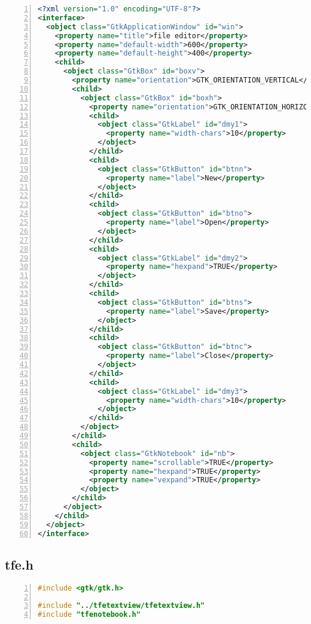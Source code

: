 \begin{lstlisting}[language=XML, numbers=left]
<?xml version="1.0" encoding="UTF-8"?>
<interface>
  <object class="GtkApplicationWindow" id="win">
    <property name="title">file editor</property>
    <property name="default-width">600</property>
    <property name="default-height">400</property>
    <child>
      <object class="GtkBox" id="boxv">
        <property name="orientation">GTK_ORIENTATION_VERTICAL</property>
        <child>
          <object class="GtkBox" id="boxh">
            <property name="orientation">GTK_ORIENTATION_HORIZONTAL</property>
            <child>
              <object class="GtkLabel" id="dmy1">
                <property name="width-chars">10</property>
              </object>
            </child>
            <child>
              <object class="GtkButton" id="btnn">
                <property name="label">New</property>
              </object>
            </child>
            <child>
              <object class="GtkButton" id="btno">
                <property name="label">Open</property>
              </object>
            </child>
            <child>
              <object class="GtkLabel" id="dmy2">
                <property name="hexpand">TRUE</property>
              </object>
            </child>
            <child>
              <object class="GtkButton" id="btns">
                <property name="label">Save</property>
              </object>
            </child>
            <child>
              <object class="GtkButton" id="btnc">
                <property name="label">Close</property>
              </object>
            </child>
            <child>
              <object class="GtkLabel" id="dmy3">
                <property name="width-chars">10</property>
              </object>
            </child>
          </object>
        </child>
        <child>
          <object class="GtkNotebook" id="nb">
            <property name="scrollable">TRUE</property>
            <property name="hexpand">TRUE</property>
            <property name="vexpand">TRUE</property>
          </object>
        </child>
      </object>
    </child>
  </object>
</interface>
\end{lstlisting}

\hypertarget{tfe.h}{%
\subsection{tfe.h}\label{tfe.h}}

\begin{lstlisting}[language=C, numbers=left]
#include <gtk/gtk.h>

#include "../tfetextview/tfetextview.h"
#include "tfenotebook.h"
\end{lstlisting}

